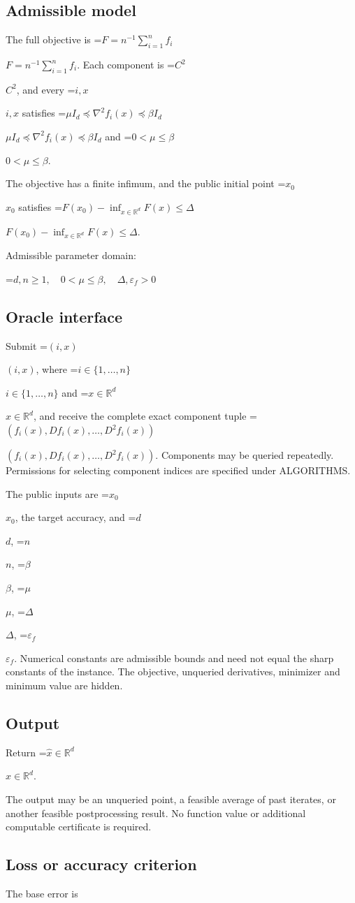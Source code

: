 \documentclass[10pt,a4paper]{article}
\newcommand{\AtlasMath}[1]{\par\begingroup\centering\setbox0=\hbox{$\displaystyle #1$}\ifdim\wd0>1.4\linewidth\typeout{ATLAS WIDE FORMULA: \the\wd0}\fi\ifdim\wd0>\linewidth\resizebox{\linewidth}{!}{\box0}\else\box0\fi\par\endgroup}
\newcommand{\AtlasInlineMath}[1]{\begingroup\setbox0=\hbox{$#1$}\ifdim\wd0>.4\linewidth\endgroup\AtlasMath{#1}\else\endgroup$#1$\fi}
\begin{document}
\subsection{Admissible model}
The full objective is \AtlasInlineMath{F=n^{-1}\sum_{i=1}^n f_i}. Each component is \AtlasInlineMath{C^2}, and every \AtlasInlineMath{i,x} satisfies \AtlasInlineMath{\mu I_d\preceq\nabla^2f_i(x)\preceq\beta I_d} and \AtlasInlineMath{0<\mu\le\beta}.

The objective has a finite infimum, and the public initial point \AtlasInlineMath{x_0} satisfies \AtlasInlineMath{F(x_0)-\inf_{x\in \mathbb{R}^d}F(x)\le\Delta}.

Admissible parameter domain:


\AtlasMath{d,n\ge1,\quad0<\mu\le\beta,\quad\Delta,\varepsilon_f>0}


\subsection{Oracle interface}
Submit \AtlasInlineMath{(i,x)}, where \AtlasInlineMath{i\in\{1,\ldots,n\}} and \AtlasInlineMath{x\in\mathbb{R}^d}, and receive the complete exact component tuple \AtlasInlineMath{(f_i(x),Df_i(x),\ldots,D^{2}f_i(x))}. Components may be queried repeatedly. Permissions for selecting component indices are specified under ALGORITHMS.

The public inputs are \AtlasInlineMath{x_0}, the target accuracy, and \AtlasInlineMath{d}, \AtlasInlineMath{n}, \AtlasInlineMath{\beta}, \AtlasInlineMath{\mu}, \AtlasInlineMath{\Delta}, \AtlasInlineMath{\varepsilon_f}. Numerical constants are admissible bounds and need not equal the sharp constants of the instance. The objective, unqueried derivatives, minimizer and minimum value are hidden.

\subsection{Output}
Return \AtlasInlineMath{\widehat{x}\in \mathbb{R}^d}.

The output may be an unqueried point, a feasible average of past iterates, or another feasible postprocessing result. No function value or additional computable certificate is required.

\subsection{Loss or accuracy criterion}
The base error is
\end{document}
